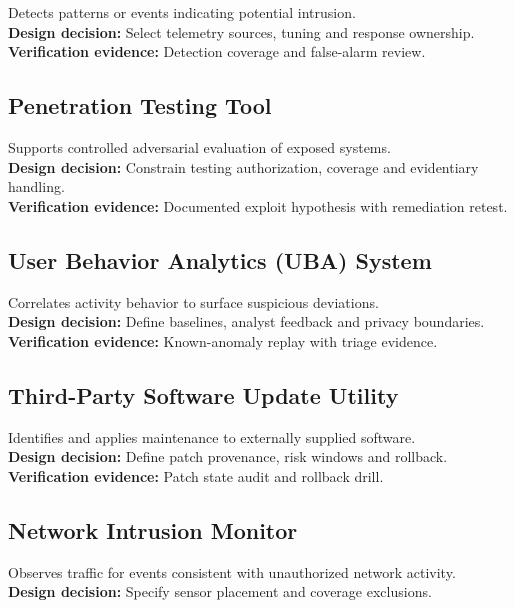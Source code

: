 \documentclass[10pt,letterpaper]{article}
\begin{document}
Detects patterns or events indicating potential intrusion.\\[4pt]
\textbf{Design decision:} Select telemetry sources, tuning and response ownership.\\[3pt]
\textbf{Verification evidence:} Detection coverage and false-alarm review.\\[3pt]
\subsection{Penetration Testing Tool}
Supports controlled adversarial evaluation of exposed systems.\\[4pt]
\textbf{Design decision:} Constrain testing authorization, coverage and evidentiary handling.\\[3pt]
\textbf{Verification evidence:} Documented exploit hypothesis with remediation retest.\\[3pt]
\subsection{User Behavior Analytics (UBA) System}
Correlates activity behavior to surface suspicious deviations.\\[4pt]
\textbf{Design decision:} Define baselines, analyst feedback and privacy boundaries.\\[3pt]
\textbf{Verification evidence:} Known-anomaly replay with triage evidence.\\[3pt]
\subsection{Third-Party Software Update Utility}
Identifies and applies maintenance to externally supplied software.\\[4pt]
\textbf{Design decision:} Define patch provenance, risk windows and rollback.\\[3pt]
\textbf{Verification evidence:} Patch state audit and rollback drill.\\[3pt]
\subsection{Network Intrusion Monitor}
Observes traffic for events consistent with unauthorized network activity.\\[4pt]
\textbf{Design decision:} Specify sensor placement and coverage exclusions.\\[3pt]
\end{document}

